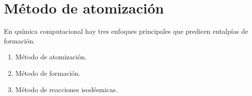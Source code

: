 \section{Método de atomización} 

En química computacional hay tres enfoques principales que predicen entalpías de formación. 

\begin{enumerate}
\item Método de atomización.
\item Método de formación.
\item Método de reacciones isodésmicas.
\end{enumerate}

